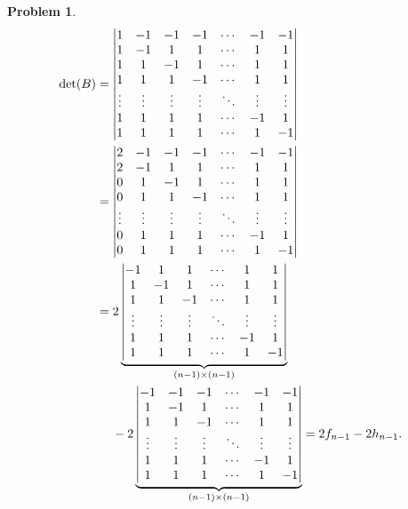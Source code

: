 \documentclass{article}
\theoremstyle{pprop}
\newtheorem{problem}{Problem}[section]
\begin{document}
\begin{problem}
\begin{align*}
  \det(B) & =
  \mqty|  
  1 & -1 & -1 & -1 & \cdots & -1 & -1 \\
  1 & -1 & 1 & 1 & \cdots & 1 & 1 \\
  1 & 1 & -1 & 1 & \cdots & 1 & 1 \\
  1 & 1 & 1 & -1 & \cdots & 1 & 1 \\
  \vdots & \vdots & \vdots & \vdots & \ddots & \vdots & \vdots \\
  1 & 1 & 1 & 1 & \cdots & -1 & 1 \\
  1 & 1 & 1 & 1 & \cdots & 1 & -1 \\  
  | \\
  & = 
  \mqty|
  2 & -1 & -1 & -1 & \cdots & -1 & -1 \\
  2 & -1 & 1 & 1 & \cdots & 1 & 1 \\
  0 & 1 & -1 & 1 & \cdots & 1 & 1 \\
  0 & 1 & 1 & -1 & \cdots & 1 & 1 \\
  \vdots & \vdots & \vdots & \vdots & \ddots & \vdots & \vdots \\
  0 & 1 & 1 & 1 & \cdots & -1 & 1 \\
  0 & 1 & 1 & 1 & \cdots & 1 & -1 \\  
  | \\
  & = 2  
  \underbrace{  \mqty|
   -1 & 1 & 1 & \cdots & 1 & 1 \\
   1 & -1 & 1 & \cdots & 1 & 1 \\
   1   & 1 & -1 & \cdots & 1 & 1 \\
   \vdots & \vdots & \vdots & \ddots & \vdots & \vdots \\
   1 & 1 & 1 & \cdots & -1 & 1 \\
   1 & 1 & 1 & \cdots & 1 & -1 \\  
  |}_{(n-1)\times(n-1)} \\
  & \kern3ex - 2 
  \underbrace{\mqty|
  -1       &  -1 & -1 & \cdots & -1 & -1 \\
  1       &  -1 & 1 & \cdots & 1 & 1 \\
  1       &  1 & -1 & \cdots & 1 & 1 \\
  \vdots  &  \vdots & \vdots & \ddots & \vdots & \vdots \\
  1       &  1 & 1 & \cdots & -1 & 1 \\
  1       &  1 & 1 & \cdots & 1 & -1 \\  
  | }_{(n-1)\times(n-1)} = 2 f_{n-1} -2 h_{n-1}.
\end{align*}

\end{problem}
\end{document}
